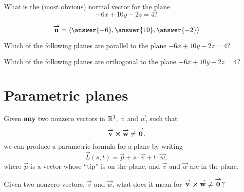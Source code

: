 \documentclass{ximera}
\begin{document}
\begin{question}
  What is the (most obvious) normal vector for the plane
  \[
  -6x+10y-2z = 4?
  \]
  \begin{prompt}
    \[
    \vec{n} = \vector{\answer{-6},\answer{10},\answer{-2}}
    \]
  \end{prompt}
  \begin{question}
    Which of the following planes are parallel to the plane $-6x+10y-2z = 4$?
    \begin{selectAll}
    \end{selectAll}
      \begin{question}
    Which of the following planes are orthogonal to the plane $-6x+10y-2z = 4$?
    \begin{selectAll}
    \end{selectAll}
  \end{question}
  \end{question}
\end{question}


\section{Parametric planes}


Given \textbf{any} two nonzero vectors in $\mathbb R^3$, $\vec{v}$ and
$\vec{w}$, such that
\[
{\overset{\boldsymbol{\rightharpoonup}}{\mathbf{v}}}\boldsymbol\times {\overset{\boldsymbol{\rightharpoonup}}{\mathbf{w}}} \ne {\overset{\boldsymbol{\rightharpoonup}}{\mathbf{0}}},
\]
we can produce a parametric formula for a plane by writing
\[
\vec{L}(s,t) = \vec{p} + s\cdot \vec{v} + t\cdot\vec{w},
\]
where $\vec{p}$ is a vector whose ``tip'' is on the plane, and
$\vec{v}$ and $\vec{w}$ are in the plane.
\begin{question}
  Given two nonzero vectors, $\vec{v}$ and $\vec{w}$, what does it
  mean for ${\overset{\boldsymbol{\rightharpoonup}}{\mathbf{v}}}\boldsymbol\times {\overset{\boldsymbol{\rightharpoonup}}{\mathbf{w}}} \ne {\overset{\boldsymbol{\rightharpoonup}}{\mathbf{0}}}$?
  \begin{prompt}
    \begin{multipleChoice}
    \end{multipleChoice}
  \end{prompt}
\end{question}
\end{document}
